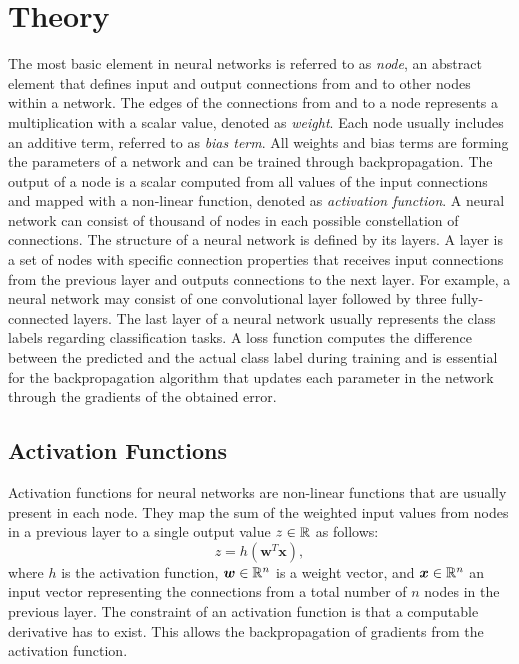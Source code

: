 
\section{Theory}\label{sec:nn_theory}
The most basic element in neural networks is referred to as \emph{node}, an abstract element that defines input and output connections from and to other nodes within a network.
The edges of the connections from and to a node represents a multiplication with a scalar value, denoted as \emph{weight}.
Each node usually includes an additive term, referred to as \emph{bias term}.
All weights and bias terms are forming the parameters of a network and can be trained through backpropagation.
The output of a node is a scalar computed from all values of the input connections and mapped with a non-linear function, denoted as \emph{activation function}.
A neural network can consist of thousand of nodes in each possible constellation of connections.
The structure of a neural network is defined by its layers.
A layer is a set of nodes with specific connection properties that receives input connections from the previous layer and outputs connections to the next layer.
For example, a neural network may consist of one convolutional layer followed by three fully-connected layers.
The last layer of a neural network usually represents the class labels regarding classification tasks.
A loss function computes the difference between the predicted and the actual class label during training and is essential for the backpropagation algorithm that updates each parameter in the network through the gradients of the obtained error.



\subsection{Activation Functions}\label{sec:nn_theory_acti}
Activation functions for neural networks are non-linear functions that are usually present in each node.
They map the sum of the weighted input values from nodes in a previous layer to a single output value $z \in \mathbb{R}$ as follows:
\begin{equation}\label{eq:nn_theory_acti}
  z = h(\bm{w}^T \bm{x}),
\end{equation}
where $h$ is the activation function, $\bm{w} \in \mathbb{R}^n$ is a weight vector, and $\bm{x} \in \mathbb{R}^n$ an input vector representing the connections from a total number of $n$ nodes in the previous layer.
The constraint of an activation function is that a computable derivative has to exist.
This allows the backpropagation of gradients from the activation function.

